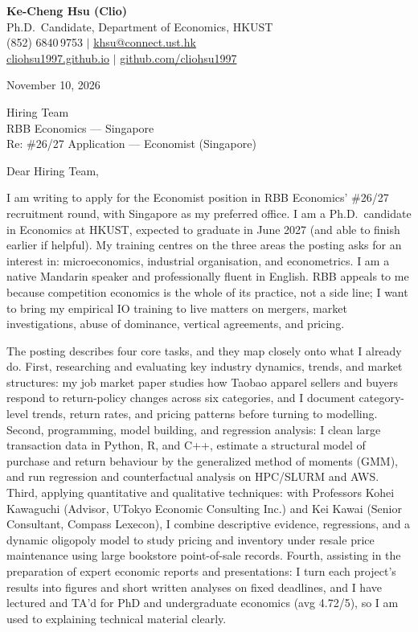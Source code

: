 \documentclass[11pt,letterpaper]{article}
\begin{document}
\noindent
{\bfseries Ke-Cheng Hsu (Clio)}\\
Ph.D.\ Candidate, Department of Economics, HKUST\\
(852) 6840\,9753 \quad $|$ \quad \href{mailto:khsu@connect.ust.hk}{khsu@connect.ust.hk}\\
\href{https://cliohsu1997.github.io/}{cliohsu1997.github.io} \quad $|$ \quad \href{https://github.com/cliohsu1997}{github.com/cliohsu1997}

\vspace{0.7em}
\noindent
November 10, 2026

\vspace{0.35em}
\noindent
Hiring Team\\
RBB Economics --- Singapore\\
Re: \#26/27 Application --- Economist (Singapore)

\vspace{0.2em}
Dear Hiring Team,

I am writing to apply for the Economist position in RBB Economics' \#26/27 recruitment round, with Singapore as my preferred office. I am a Ph.D.\ candidate in Economics at HKUST, expected to graduate in June 2027 (and able to finish earlier if helpful). My training centres on the three areas the posting asks for an interest in: microeconomics, industrial organisation, and econometrics. I am a native Mandarin speaker and professionally fluent in English. RBB appeals to me because competition economics is the whole of its practice, not a side line; I want to bring my empirical IO training to live matters on mergers, market investigations, abuse of dominance, vertical agreements, and pricing.

The posting describes four core tasks, and they map closely onto what I already do. First, researching and evaluating key industry dynamics, trends, and market structures: my job market paper studies how Taobao apparel sellers and buyers respond to return-policy changes across six categories, and I document category-level trends, return rates, and pricing patterns before turning to modelling. Second, programming, model building, and regression analysis: I clean large transaction data in Python, R, and C++, estimate a structural model of purchase and return behaviour by the generalized method of moments (GMM), and run regression and counterfactual analysis on HPC/SLURM and AWS. Third, applying quantitative and qualitative techniques: with Professors Kohei Kawaguchi (Advisor, UTokyo Economic Consulting Inc.) and Kei Kawai (Senior Consultant, Compass Lexecon), I combine descriptive evidence, regressions, and a dynamic oligopoly model to study pricing and inventory under resale price maintenance using large bookstore point-of-sale records. Fourth, assisting in the preparation of expert economic reports and presentations: I turn each project's results into figures and short written analyses on fixed deadlines, and I have lectured and TA'd for PhD and undergraduate economics (avg 4.72/5), so I am used to explaining technical material clearly.
\end{document}

